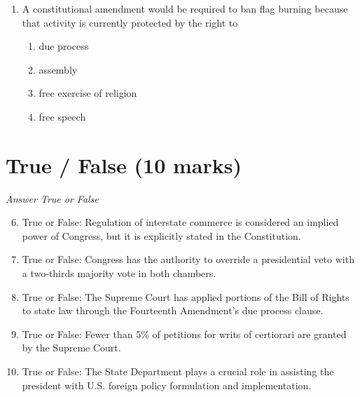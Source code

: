 \documentclass[12pt]{article}
\begin{document}
\begin{enumerate}[label=\arabic*.]
\begin{enumerate}[label=(\alph*)]
    \item A new democratic internationalism led by the United States
    \item A new balance of power between the US and China
    \item A new global economic framework
    \item A new era of globalization
\end{enumerate}
\item A constitutional amendment would be required to ban flag burning because that activity is currently protected by the right to
\begin{enumerate}[label=(\alph*)]
    \item due process
    \item assembly
    \item free exercise of religion
    \item free speech
\end{enumerate}
\end{enumerate}

\section*{True / False (10 marks)}
\textit{Answer True or False}
\begin{enumerate}[label=\arabic*.]
\setcounter{enumi}{5}
\item True or False: Regulation of interstate commerce is considered an implied power of Congress, but it is explicitly stated in the Constitution.
\item True or False: Congress has the authority to override a presidential veto with a two-thirds majority vote in both chambers.
\item True or False: The Supreme Court has applied portions of the Bill of Rights to state law through the Fourteenth Amendment's due process clause.
\item True or False: Fewer than 5\% of petitions for writs of certiorari are granted by the Supreme Court.
\item True or False: The State Department plays a crucial role in assisting the president with U.S. foreign policy formulation and implementation.
\end{enumerate}
\end{document}

